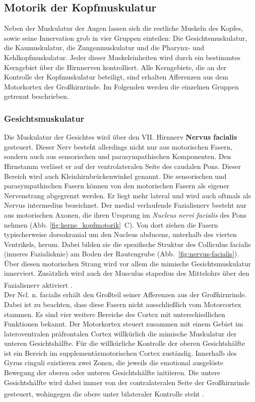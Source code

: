 
\subsection{Motorik der Kopfmuskulatur} 
Neben der Muskulatur der Augen lassen sich die restliche Muskeln des Kopfes, sowie seine Innervation grob in vier Gruppen einteilen: Die Gesichtsmuskulatur, die Kaumuskulatur, die Zungenmuskulatur und die Pharynx- und Kehlkopfmuskulatur. Jeder dieser Muskeleinheiten wird durch ein bestimmtes Kerngebiet über die Hirnnerven kontrolliert. Alle Kerngebiete, die an der Kontrolle der Kopfmuskulatur beteiligt, sind erhalten Afferenzen aus dem Motorkortex der Großhirnrinde. Im Folgenden werden die einzelnen Gruppen getrennt beschrieben.

\subsubsection*{Gesichtsmuskulatur}
Die Muskulatur der Gesichtes wird über den VII. Hirnnerv \textbf{Nervus facialis}  gesteuert. Dieser Nerv besteht allerdings nicht nur aus motorischen Fasern, sondern auch aus sensorischen und parasympathischen Komponenten. Den Hirnstamm verlässt er auf der ventrolateralen Seite des caudalen Pons. Dieser Bereich wird auch Kleinhirnbrückenwinkel genannt. Die sensorischen und parasympathischen Fasern können von den motorischen Fasern als eigener Nervenstrang abgegrenzt werden. Er liegt mehr lateral und wird auch oftmals als Nervus intermedius bezeichnet. Der medial verlaufende Fazialisnerv besteht nur aus motorischen Axonen, die ihren Ursprung im \textit{Nucleus nervi facialis}  des Pons nehmen (Abb. \ref{fig:kerne_kopfmotorik}~C). Von dort ziehen die Fasern typischerweise dorsokranial um den Nucleus abducens, unterhalb des vierten Ventrikels, herum. Dabei bilden sie die spezifische Struktur des Colliculus facialis (inneres Fazialisknie) am Boden der Rautengrube (Abb.~\ref{fig:nervus-facialis}). Über diesen motorischen Strang wird vor allem die mimische Gesichtsmuskulatur innerviert. Zusätzlich wird auch der Musculus stapedius des Mittelohrs über den Fazialisnerv aktiviert \textsuperscript{\cite[Kap.~10][5]{crossman2014neuroanatomy, trepel2011neuroanatomie}}. \\
Der Ncl. n. facialis erhält den Großteil seiner Afferenzen aus der Großhirnrinde. Dabei ist zu beachten, dass diese Fasern nicht ausschließlich vom Motorcortex stammen. Es sind vier weitere Bereiche des Cortex mit unterschiedlichen Funktionen bekannt. Der Motorkortex steuert zusammen mit einem Gebiet im lateroventralen präfrontalen Cortex willkürlich die mimische Muskulatur der unteren Gesichtshälfte. Für die willkürliche Kontrolle der oberen Gesichtshälfte ist ein Bereich im supplementärmotorischen Cortex zuständig. Innerhalb des Gyrus cinguli existieren zwei Zonen, die jeweils die emotional ausgelöste Bewegung der oberen oder unteren Gesichtshälfte initiieren. Die untere Gesichtshälfte wird dabei immer von der contralateralen Seite der Großhirnrinde gesteuert, wohingegen die obere unter bilateraler Kontrolle steht \textsuperscript{\cite[Kap.~9]{trepel2011neuroanatomie}}. \\
